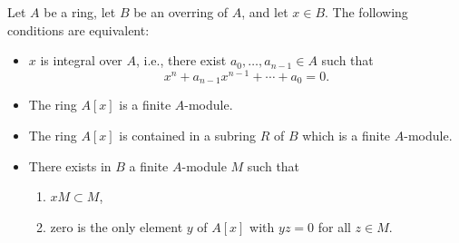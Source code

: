 Let $A$ be a ring, let $B$ be an overring of $A$, and let $x \in B$. The following conditions are equivalent:

\begin{itemize}
\item[(c)] $x$ is integral over $A$, i.e., there exist $a_0, \dots, a_{n-1} \in A$ such that
  $$x^n + a_{n-1}x^{n-1} + \cdots + a_0 = 0.$$

\item[(c')] The ring $A[x]$ is a finite $A$-module.

\item[(c'')] The ring $A[x]$ is contained in a subring $R$ of $B$ which is a finite $A$-module.

\item[(c''')] There exists in $B$ a finite $A$-module $M$ such that
  \begin{enumerate}
    \item $xM \subset M$,
    \item zero is the only element $y$ of $A[x]$ with $yz = 0$ for all $z \in M$.
  \end{enumerate}
\end{itemize}
